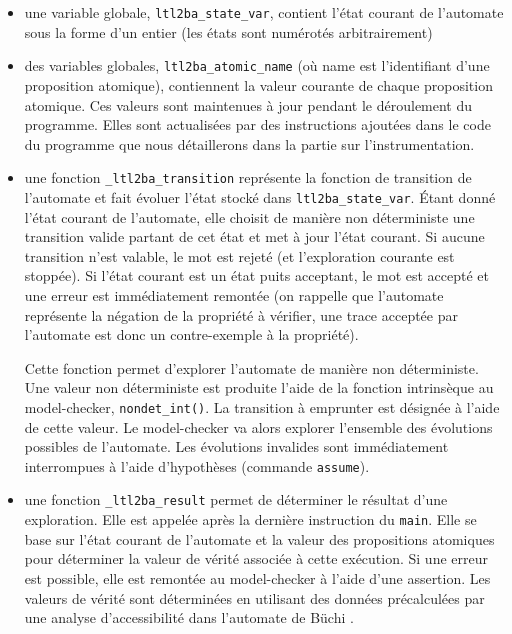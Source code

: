 \begin{itemize}
\item
  une variable globale, \texttt{ltl2ba\_state\_var}, contient l'état
  courant de l'automate sous la forme d'un entier (les états sont
  numérotés arbitrairement)
\item
  des variables globales, \texttt{ltl2ba\_atomic\_{name}} (où name est
  l'identifiant d'une proposition atomique), contiennent la valeur
  courante de chaque proposition atomique. Ces valeurs sont maintenues à
  jour pendant le déroulement du programme. Elles sont actualisées par
  des instructions ajoutées dans le code du programme que nous
  détaillerons dans la partie sur l'instrumentation.
\item
  une fonction \texttt{\_ltl2ba\_transition} représente la fonction de
  transition de l'automate et fait évoluer l'état stocké dans
  \texttt{ltl2ba\_state\_var}. Étant donné l'état courant de
  l'automate, elle choisit de manière non déterministe une transition
  valide partant de cet état et met à jour l'état courant. Si aucune
  transition n'est valable, le mot est rejeté (et l'exploration courante
  est stoppée). Si l'état courant est un état puits acceptant, le mot
  est accepté et une erreur est immédiatement remontée (on rappelle que
  l'automate représente la négation de la propriété à vérifier, une
  trace acceptée par l'automate est donc un contre-exemple à la
  propriété).

  Cette fonction permet d'explorer l'automate de manière
  non déterministe. Une valeur non déterministe est produite l'aide de
  la fonction intrinsèque au model-checker, \texttt{nondet\_int()}. La
  transition à emprunter est désignée à l'aide de cette valeur. Le
  model-checker va alors explorer l'ensemble des évolutions possibles de
  l'automate. Les évolutions invalides sont immédiatement interrompues à
  l'aide d'hypothèses (commande \texttt{assume}).
\item
  une fonction \texttt{\_ltl2ba\_result} permet de déterminer le
  résultat d'une exploration. Elle est appelée après la dernière
  instruction du \texttt{main}. Elle se base sur l'état courant de
  l'automate et la valeur des propositions atomiques pour déterminer la
  valeur de vérité associée à cette exécution. Si une erreur est
  possible, elle est remontée au model-checker à l'aide d'une assertion.
  Les valeurs de vérité sont déterminées en utilisant des données
  précalculées par une analyse d'accessibilité dans l'automate de Büchi
  \cite{morse_ltl}.
\end{itemize}

